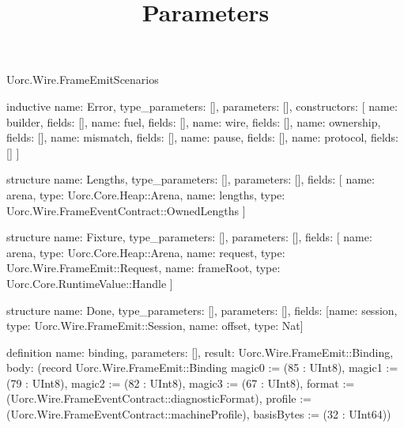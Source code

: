 \begin{lexlean}{Uorc.Wire.FrameEmitScenarios}
\title{Parameters}
\begin{semanticmodule}
inductive{
  name: Error,
  type_parameters: [],
  parameters: [],
  constructors: [
    {name: builder, fields: []},
    {name: fuel, fields: []},
    {name: wire, fields: []},
    {name: ownership, fields: []},
    {name: mismatch, fields: []},
    {name: pause, fields: []},
    {name: protocol, fields: []}
  ]
}

structure{
  name: Lengths,
  type_parameters: [],
  parameters: [],
  fields: [
    {name: arena, type: Uorc.Core.Heap::Arena},
    {name: lengths, type: Uorc.Wire.FrameEventContract::OwnedLengths}
  ]
}

structure{
  name: Fixture,
  type_parameters: [],
  parameters: [],
  fields: [
    {name: arena, type: Uorc.Core.Heap::Arena},
    {name: request, type: Uorc.Wire.FrameEmit::Request},
    {name: frameRoot, type: Uorc.Core.RuntimeValue::Handle}
  ]
}

structure{
  name: Done,
  type_parameters: [],
  parameters: [],
  fields: [{name: session, type: Uorc.Wire.FrameEmit::Session}, {name: offset, type: Nat}]
}

definition{
  name: binding,
  parameters: [],
  result: Uorc.Wire.FrameEmit::Binding,
  body: (record Uorc.Wire.FrameEmit::Binding {magic0 := (85 : UInt8), magic1 := (79 : UInt8), magic2 := (82 : UInt8), magic3 := (67 : UInt8), format := (Uorc.Wire.FrameEventContract::diagnosticFormat), profile := (Uorc.Wire.FrameEventContract::machineProfile), basisBytes := (32 : UInt64)})
}


\end{semanticmodule}
\end{lexlean}
